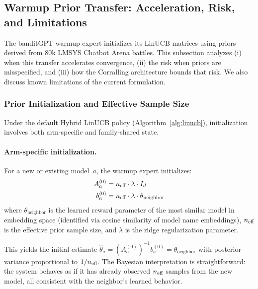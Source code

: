 
\subsection{Warmup Prior Transfer: Acceleration, Risk, and Limitations}
\label{appendix:warmup_transfer}

The banditGPT warmup expert initializes its LinUCB matrices using priors
derived from 80k LMSYS Chatbot Arena battles.  This subsection analyzes
(i) when this transfer accelerates convergence, (ii) the risk when priors are
misspecified, and (iii) how the Corralling architecture bounds that risk.  We
also discuss known limitations of the current formulation.

\subsubsection{Prior Initialization and Effective Sample Size}

Under the default Hybrid LinUCB policy (Algorithm~\ref{alg:linucb}),
initialization involves both arm-specific and family-shared state.

\paragraph{Arm-specific initialization.}
For a new or existing model~$a$, the warmup expert initializes:
\begin{align}
A_a^{(0)} &= n_{\text{eff}} \cdot \lambda \cdot I_d \label{eq:warmup_A} \\
b_a^{(0)} &= n_{\text{eff}} \cdot \lambda \cdot \theta_{\text{neighbor}} \label{eq:warmup_b}
\end{align}
where $\theta_{\text{neighbor}}$ is the learned reward parameter of the most
similar model in embedding space (identified via cosine similarity of model
name embeddings), $n_{\text{eff}}$ is the effective prior sample size, and $\lambda$ is
the ridge regularization parameter.

This yields the initial estimate $\hat{\theta}_a = (A_a^{(0)})^{-1} b_a^{(0)} =
\theta_{\text{neighbor}}$ with posterior variance proportional to $1 / n_{\text{eff}}$.
The Bayesian interpretation is straightforward: the system behaves as if it has
already observed $n_{\text{eff}}$ samples from the new model, all consistent with the
neighbor's learned behavior.

